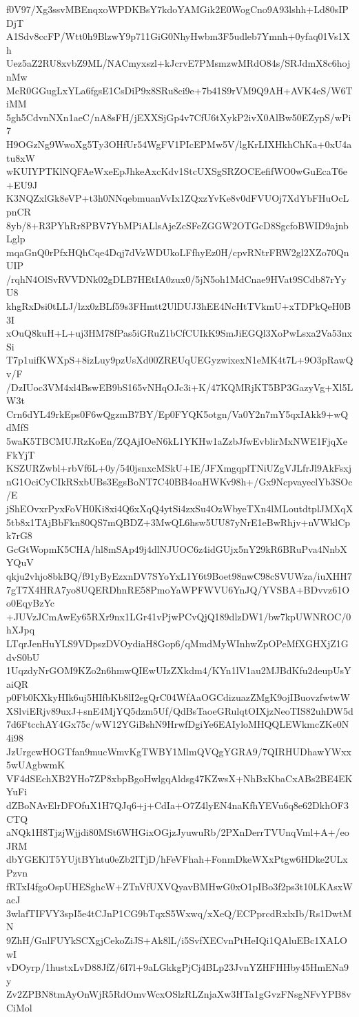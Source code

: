 f0V97/Xg3ssvMBEnqxoWPDKBsY7kdoYAMGik2E0WogCno9A93lshh+Ld80sIPDjT
A1Sdv8ccFP/Wtt0h9BlzwY9p711GiG0NhyHwbm3F5udleb7Ymnh+0yfaq01Vs1Xh
Uez5aZ2RU8xvbZ9ML/NACmyxszl+kJcrvE7PMsmzwMRdO84s/SRJdmX8c6hojnMw
McR0GGugLxYLa6fgsE1CsDiP9x8SRu8ci9e+7b41S9rVM9Q9AH+AVK4eS/W6TiMM
5gh5CdvnNXn1aeC/nA8sFH/jEXXSjGp4v7CfU6tXykP2ivX0AlBw50EZypS/wPi7
H9OGzNg9WwoXg5Ty3OHfUr54WgFV1PIcEPMw5V/lgKrLIXHkhChKa+0xU4atu8xW
wKUIYPTKlNQFAeWxeEpJhkeAxcKdv1StcUXSgSRZOCEefifWO0wGuEcaT6e+EU9J
K3NQZxlGk8eVP+t3h0NNqebmuanVvIx1ZQxzYvKe8v0dFVUOj7XdYbFHuOcLpnCR
8yb/8+R3PYhRr8PBV7YbMPiALlsAjeZcSFeZGGW2OTGcD8SgcfoBWID9ajnbLglp
mqaGnQ0rPfxHQhCqe4Dqj7dVzWDUkoLFfhyEz0H/cpvRNtrFRW2gl2XZo70QnUIP
/rqhN4OlSvRVVDNk02gDLB7HEtIA0zux0/5jN5oh1MdCnae9HVat9SCdb87rYyU8
khgRxDsi0tLLJ/lzx0zBLf59s3FHmtt2UlDUJ3hEE4NcHtTVkmU+xTDPkQeH0B3I
xOuQ8kuH+L+uj3HM78fPas5iGRuZ1bCfCUIkK9SmJiEGQl3XoPwLsxa2Va53nxSi
T7p1uifKWXpS+8izLuy9pzUsXd00ZREUqUEGyzwixexN1eMK4t7L+9O3pRawQv/F
/DzIUoc3VM4xl4BswEB9bS165vNHqOJc3i+K/47KQMRjKT5BP3GazyVg+Xl5LW3t
Crn6dYL49rkEps0F6wQgzmB7BY/Ep0FYQK5otgn/Va0Y2n7mY5qxIAkk9+wQdMfS
5waK5TBCMUJRzKoEn/ZQAjIOeN6kL1YKHw1aZzbJfwEvblirMxNWE1FjqXeFkYjT
KSZURZwbl+rbVf6L+0y/540jsnxcMSkU+IE/JFXmgqplTNiUZgVJLfrJl9AkFsxj
nG1OciCyCIkRSxbUBs3EgsBoNT7C40BB4oaHWKv98h+/Gx9NcpvayeclYb3SOc/E
jShEOvxrPyxFoVH0Ki8xi4Q6xXqQ4ytSi4zxSu4OzWbyeTXn4lMLoutdtplJMXqX
5tb8x1TAjBbFkn80QS7mQBDZ+3MwQL6hsw5UU87yNrE1eBwRhjv+nVWklCpk7rG8
GcGtWopmK5CHA/hl8mSAp49j4dlNJUOC6z4idGUjx5nY29kR6BRuPva4NnbXYQuV
qkju2vhjo8bkBQ/f91yByEzxnDV7SYoYxL1Y6t9Boet98nwC98cSVUWza/iuXHH7
7gT7X4HRA7yo8UQERDhnRE58PmoYaWPFWVU6YnJQ/YVSBA+BDvvz61Oo0EqyBzYc
+JUVzJCmAwEy65RXr9nx1LGr41vPjwPCvQjQ189dlzDW1/bw7kpUWNROC/0hXJpq
LTqrJenHuYLS9VDpszDVOydiaH8Gop6/qMmdMyWInhwZpOPeMfXGHXjZ1GdvS0bU
1UqzdyNrGOM9KZo2n6hmwQIEwUIzZXkdm4/KYn1lV1au2MJBdKfu2deupUsYaiQR
p0Fb0KXkyHIk6uj5HIfbKb8lI2egQrC04WfAaOGCdizuazZMgK9ojIBuovzfwtwW
XSlviERjv89uxJ+snE4MjYQ5dzm5Uf/QdBsTaoeGRulqtOIXjzNeoTIS82uhDW5d
7d6FtcchAY4Gx75c/wW12YGiBshN9HrwfDgiYe6EAIyloMHQQLEWkmcZKe0N4i98
JzUrgcwHOGTfan9mucWmvKgTWBY1MlmQVQgYGRA9/7QIRHUDhawYWxx5wUAgbwmK
VF4dSEchXB2YHo7ZP8xbpBgoHwlgqAldsg47KZwsX+NhBxKbaCxABs2BE4EKYuFi
dZBoNAvElrDFOfuX1H7QJq6+j+CdIa+O7Z4lyEN4naKfhYEVu6q8e62DkhOF3CTQ
aNQk1H8TjzjWjjdi80MSt6WHGixOGjzJyuwuRb/2PXnDerrTVUnqVml+A+/eoJRM
dbYGEKlT5YUjtBYhtu0eZb2ITjD/hFeVFhah+FonmDkeWXxPtgw6HDke2ULxPzvn
fRTxI4fgoOspUHESghcW+ZTnVfUXVQyavBMHwG0xO1pIBo3f2ps3t10LKAsxWacJ
3wlafTIFVY3spI5e4tCJnP1CG9bTqxS5Wxwq/xXeQ/ECPprcdRxlxIb/Rs1DwtMN
9ZhH/GnlFUYkSCXgjCekoZiJS+Ak8lL/i5SvfXECvnPtHeIQi1QAluEBc1XALOwI
vDOyrp/1hustxLvD88JfZ/6I7l+9aLGkkgPjCj4BLp23JvnYZHFHHby45HmENa9y
Zv2ZPBN8tmAyOnWjR5RdOmvWcxOSlzRLZnjaXw3HTa1gGvzFNsgNFvYPB8vCiMol
